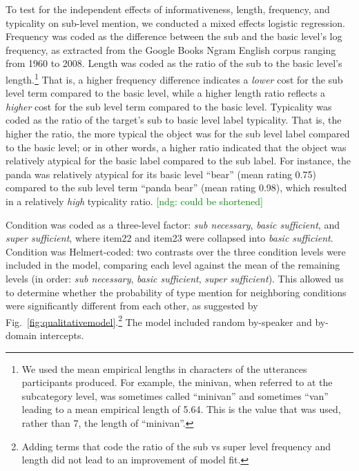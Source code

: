 \documentclass[10pt,letterpaper]{article}
\newcommand{\ndg}[1]{\textcolor{Green}{[ndg: #1]}}
\newcommand{\figref}[1]{Fig.~\ref{#1}}
\begin{document}
To test for the independent effects of informativeness, length, frequency, and typicality on sub-level mention, we conducted a mixed effects logistic regression. Frequency was coded as the difference between the sub and the basic level's log frequency, as extracted from the Google Books Ngram English corpus ranging from 1960 to 2008. Length was coded as the ratio of the sub to the basic level's length.\footnote{We used the mean empirical lengths in characters of the utterances participants produced. For example, the minivan, when referred to at the subcategory level, was sometimes called ``minivan'' and sometimes ``van'' leading to a mean empirical length of 5.64. This is the value that was used, rather than 7, the length of ``minivan''.} That is, a higher frequency difference indicates a \emph{lower} cost for the sub level term compared to the basic level, while a higher length ratio reflects a \emph{higher} cost for the sub level term compared to the basic level. Typicality was coded as the ratio of the target's sub to basic level label typicality. That is, the higher the ratio, the more typical the object was for the sub level label compared to the basic level; or in other words, a higher ratio indicated that the object was relatively atypical for the basic label compared to the sub label. For instance, the panda was relatively atypical for its basic level ``bear'' (mean rating 0.75) compared to the sub level term ``panda bear'' (mean rating 0.98), which resulted in a relatively \emph{high} typicality ratio.
\ndg{could be shortened}

Condition was coded as a three-level factor: \emph{sub necessary}, \emph{basic sufficient}, and \emph{super sufficient}, where item22 and item23 were collapsed into \emph{basic sufficient}. Condition was Helmert-coded: two contrasts over the three condition levels were included in the model, comparing each level against the mean of the remaining levels (in order: \emph{sub necessary}, \emph{basic sufficient}, \emph{super sufficient}). This allowed us to determine whether the probability of type mention  for neighboring conditions were significantly different from each other, as suggested by \figref{fig:qualitativemodel}.\footnote{Adding terms that code the ratio of the sub vs super level frequency and length did not lead to an improvement of model fit.} The model included random by-speaker and by-domain intercepts. 
\end{document}
